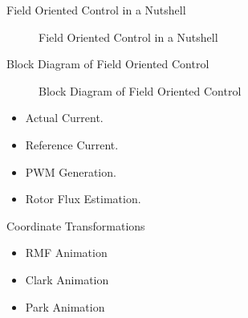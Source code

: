 \begin{frame}{Field Oriented Control in a Nutshell}
	\begin{figure}
		\centering
		\caption{Field Oriented Control in a Nutshell}
	\end{figure}
\end{frame}
\begin{frame}{Block Diagram of Field Oriented Control}
	\begin{figure}
		\centering
		\caption{Block Diagram of Field Oriented Control}
	\end{figure}
	\begin{itemize}
		\item Actual Current.
		\item Reference Current.
		\item PWM Generation.
		\item Rotor Flux Estimation.
	\end{itemize}
\end{frame}


\begin{frame}{Coordinate Transformations}
	\begin{itemize}
		\item RMF Animation
		\item Clark Animation
		\item Park Animation
	\end{itemize}
\end{frame}


